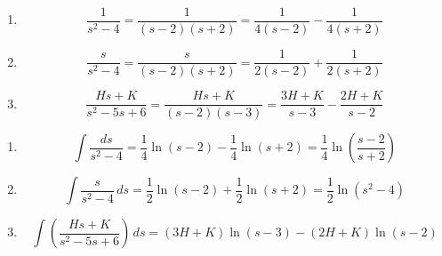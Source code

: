\documentclass[a4paper]{article}
\begin{document}
\vspace{12pt}


\begin{enumerate}[label=(\alph*)]
	\item 
	\[
		\frac{1}{s^{2} - 4} = \frac{1}{\!\left( s - 2 \right)\!\left( s + 2 \right)} = \frac{1}{4 \!\left( s - 2 \right)} - \frac{1}{4 \!\left( s + 2 \right)}
	\]
	\item 
	\[
		\frac{s }{s^{2} - 4} = \frac{s }{\!\left( s - 2 \right)\!\left( s + 2 \right)} = \frac{1}{2 \!\left( s - 2 \right)} + \frac{1}{2 \!\left( s + 2 \right)}
	\]
	\item 
	\[
		 \frac{Hs + K}{s^{2} - 5s + 6} = \frac{Hs + K}{\!\left( s - 2 \right)\!\left( s - 3 \right)} = \frac{3H + K}{s - 3} - \frac{2H + K}{s - 2}
	\]
\end{enumerate}

\newpage

\begin{enumerate}[label=(\alph*)]
	\item 
	\[ 
		\int \frac{ds }{s^{2} - 4} = \frac{1}{4}\ln\!\left(s - 2\right) - \frac{1}{4}\ln\!\left(s + 2 \right) = \frac{1}{4} \ln\!\left( \frac{s - 2}{s + 2} \right) 
	\]
	\item 
	\[
		\int \frac{s }{s^{2} - 4} \, ds = \frac{1}{2} \ln\!\left(s - 2\right) + \frac{1}{2} \ln\!\left( s + 2\right) = \frac{1}{2} \ln\!\left( s^{2} - 4 \right)   
	\]
	\item 
	\[
		\int \!\left( \frac{Hs + K}{s^{2} - 5s + 6} \right) \, ds = \!\left( 3H + K \right) \ln\!\left( s - 3 \right) - \!\left( 2H + K \right) \ln\!\left( s - 2 \right)   
	\]
\end{enumerate}
\end{document}
